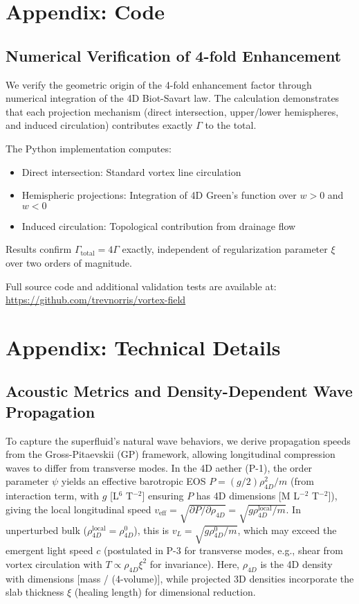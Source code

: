 \documentclass{article}
\begin{document}
\appendix

\section{Appendix: Code}

\subsection{Numerical Verification of 4-fold Enhancement}

We verify the geometric origin of the 4-fold enhancement factor through numerical integration of the 4D Biot-Savart law. The calculation demonstrates that each projection mechanism (direct intersection, upper/lower hemispheres, and induced circulation) contributes exactly $\Gamma$ to the total.

The Python implementation computes:
\begin{itemize}
\item Direct intersection: Standard vortex line circulation
\item Hemispheric projections: Integration of 4D Green's function over $w>0$ and $w<0$
\item Induced circulation: Topological contribution from drainage flow
\end{itemize}

Results confirm $\Gamma_{\text{total}} = 4\Gamma$ exactly, independent of regularization parameter $\xi$ over two orders of magnitude.

Full source code and additional validation tests are available at:
\url{https://github.com/trevnorris/vortex-field}


\section{Appendix: Technical Details}

\subsection{Acoustic Metrics and Density-Dependent Wave Propagation}

To capture the superfluid's natural wave behaviors, we derive propagation speeds from the Gross-Pitaevskii (GP) framework, allowing longitudinal compression waves to differ from transverse modes. In the 4D aether (P-1), the order parameter $\psi$ yields an effective barotropic EOS $P = (g / 2) \rho_{4D}^2 / m$ (from interaction term, with $g$ [L$^6$ T$^{-2}$] ensuring $P$ has 4D dimensions [M L$^{-2}$ T$^{-2}$]), giving the local longitudinal speed $v_{\text{eff}} = \sqrt{\partial P / \partial \rho_{4D}} = \sqrt{g \rho_{4D}^{\text{local}} / m}$. In unperturbed bulk ($\rho_{4D}^{\text{local}} = \rho_{4D}^0$), this is $v_L = \sqrt{g \rho_{4D}^0 / m}$, which may exceed the emergent light speed $c$ (postulated in P-3 for transverse modes, e.g., shear from vortex circulation with $T \propto \rho_{4D} \xi^2$ for invariance). Here, $\rho_{4D}$ is the 4D density with dimensions [mass / (4-volume)], while projected 3D densities incorporate the slab thickness $\xi$ (healing length) for dimensional reduction.
\end{document}
